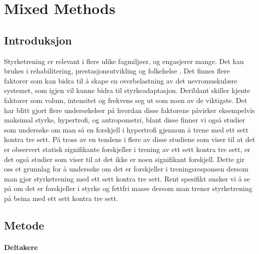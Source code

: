 \documentclass[
]{book}
\begin{document}
\hypertarget{mixed-methods}{%
\chapter{Mixed Methods}\label{mixed-methods}}

\hypertarget{introduksjon-1}{%
\section{Introduksjon}\label{introduksjon-1}}

Styrketrening er relevant i flere ulike fagmiljøer, og engasjerer mange. Det kan brukes i rehabilitering, prestasjonsutvikling og folkehelse \citep[\citet{cirer-sastre2017},\citet{lovell2017},\citet{suetta2007}]{hickey2020}. Det finnes flere faktorer som kan bidra til å skape en overbelastning av det nevromuskulære systemet, som igjen vil kunne bidra til styrkeadaptasjon\citep[\citet{marshall2011}]{rhea2002}. Deriblant skiller kjente faktorer som volum, intensitet og frekvens seg ut som noen av de viktigste. Det har blitt gjort flere undersøkelser på hvordan disse faktorene påvirker eksempelvis maksimal styrke, hypertrofi, og antropometri, blant disse finner vi også studier som undersøke om man så en forskjell i hypertrofi gjennom å trene med ett sett kontra tre sett\citetext{\citealp[\citet{rhea2002}]{schoenfeld2019}; \citealp{munn2005}; \citealp[\citet{carpinelli1998}]{fröhlich2010}}. På tross av en tendens i flere av disse studiene som viser til at det er observert statisk signifikante forskjeller i trening av ett sett kontra tre sett, er det også studier som viser til at det ikke er noen signifikant forskjell. Dette gir oss et grunnlag for å undersøke om det er forskjeller i treningsresponsen dersom man gjør styrketrening med ett sett kontra tre sett. Rent spesifikt ønsker vi å se på om det er forskjeller i styrke og fettfri masse dersom man trener styrketrening på beina med ett sett kontra tre sett.

\hypertarget{metode-1}{%
\section{Metode}\label{metode-1}}

\hypertarget{deltakere}{%
\subsubsection{Deltakere}\label{deltakere}}
\end{document}
